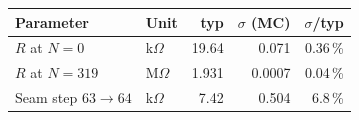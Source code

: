 \begin{tabular}{@{}llrrr@{}}
\toprule
Parameter & Unit & typ & $\sigma$ (MC) & $\sigma$/typ \\
\midrule
$R$ at $N{=}0$        & k$\Omega$ & 19.64 & 0.071  & 0.36\,\% \\
$R$ at $N{=}319$      & M$\Omega$ & 1.931 & 0.0007 & 0.04\,\% \\
Seam step $63{\to}64$ & k$\Omega$ & 7.42  & 0.504  & 6.8\,\% \\
\bottomrule
\end{tabular}
